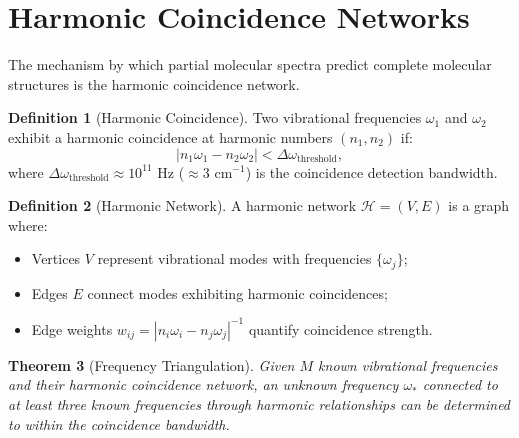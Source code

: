 \documentclass[twocolumn,10pt]{article}
\newtheorem{theorem}{Theorem}[section]
\theoremstyle{definition}
\newtheorem{definition}[theorem]{Definition}
\begin{document}
\section{Harmonic Coincidence Networks}\label{sec:harmonic_coincidence}

The mechanism by which partial molecular spectra predict complete molecular structures is the harmonic coincidence network.

\begin{definition}[Harmonic Coincidence]\label{def:harmonic_coincidence}
Two vibrational frequencies $\omega_1$ and $\omega_2$ exhibit a harmonic coincidence at harmonic numbers $(n_1, n_2)$ if:
\begin{equation}\label{eq:harmonic_coincidence}
    |n_1\omega_1 - n_2\omega_2| < \Delta\omega_{\mathrm{threshold}},
\end{equation}
where $\Delta\omega_{\mathrm{threshold}} \approx 10^{11}$ Hz ($\approx 3$ cm$^{-1}$) is the coincidence detection bandwidth.
\end{definition}

\begin{definition}[Harmonic Network]\label{def:harmonic_network}
A harmonic network $\mathcal{H} = (V, E)$ is a graph where:
\begin{itemize}[nosep]
    \item Vertices $V$ represent vibrational modes with frequencies $\{\omega_j\}$;
    \item Edges $E$ connect modes exhibiting harmonic coincidences;
    \item Edge weights $w_{ij} = |n_i\omega_i - n_j\omega_j|^{-1}$ quantify coincidence strength.
\end{itemize}
\end{definition}

\begin{theorem}[Frequency Triangulation]\label{thm:triangulation}
Given $M$ known vibrational frequencies and their harmonic coincidence network, an unknown frequency $\omega_*$ connected to at least three known frequencies through harmonic relationships can be determined to within the coincidence bandwidth.
\end{theorem}
\end{document}
